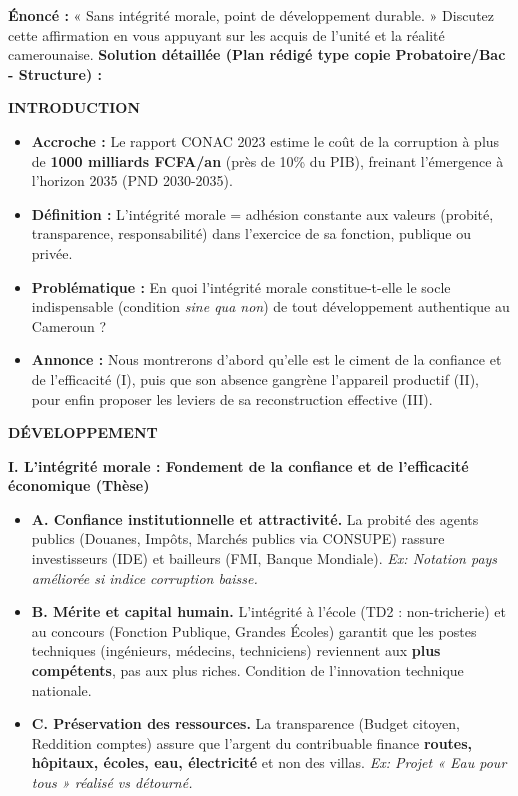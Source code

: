 \documentclass[11pt]{article}
\begin{document}
\begin{exoresolu}
    \textbf{Énoncé :} « Sans intégrité morale, point de développement durable. » Discutez cette affirmation en vous appuyant sur les acquis de l'unité et la réalité camerounaise.
    \tcblower
    \textbf{Solution détaillée (Plan rédigé type copie Probatoire/Bac - Structure) :}

    \textbf{INTRODUCTION}
    \begin{itemize}
        \item \textbf{Accroche :} Le rapport CONAC 2023 estime le coût de la corruption à plus de \textbf{1000 milliards FCFA/an} (près de 10\% du PIB), freinant l'émergence à l'horizon 2035 (PND 2030-2035).
        \item \textbf{Définition :} L'intégrité morale = adhésion constante aux valeurs (probité, transparence, responsabilité) dans l'exercice de sa fonction, publique ou privée.
        \item \textbf{Problématique :} En quoi l'intégrité morale constitue-t-elle le socle indispensable (condition \emph{sine qua non}) de tout développement authentique au Cameroun ?
        \item \textbf{Annonce :} Nous montrerons d'abord qu'elle est le ciment de la confiance et de l'efficacité (I), puis que son absence gangrène l'appareil productif (II), pour enfin proposer les leviers de sa reconstruction effective (III).
    \end{itemize}

    \textbf{DÉVELOPPEMENT}

    \textbf{I. L'intégrité morale : Fondement de la confiance et de l'efficacité économique (Thèse)}
    \begin{itemize}
        \item \textbf{A. Confiance institutionnelle et attractivité.} La probité des agents publics (Douanes, Impôts, Marchés publics via CONSUPE) rassure investisseurs (IDE) et bailleurs (FMI, Banque Mondiale). \emph{Ex: Notation pays améliorée si indice corruption baisse.}
        \item \textbf{B. Mérite et capital humain.} L'intégrité à l'école (TD2 : non-tricherie) et au concours (Fonction Publique, Grandes Écoles) garantit que les postes techniques (ingénieurs, médecins, techniciens) reviennent aux \textbf{plus compétents}, pas aux plus riches. Condition de l'innovation technique nationale.
        \item \textbf{C. Préservation des ressources.} La transparence (Budget citoyen, Reddition comptes) assure que l'argent du contribuable finance \textbf{routes, hôpitaux, écoles, eau, électricité} et non des villas. \emph{Ex: Projet « Eau pour tous » réalisé vs détourné.}
    \end{itemize}


\end{exoresolu}
\end{document}
